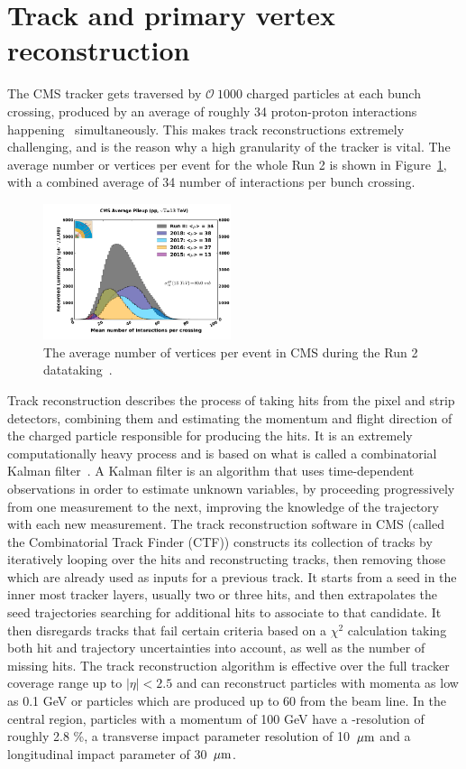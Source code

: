 \section{Track and primary vertex reconstruction}
The CMS tracker gets traversed by $\mathcal{O}~1000$ charged particles at each bunch crossing, produced by an average of roughly 34 proton-proton interactions happening ~simultaneously. This makes track reconstructions extremely challenging, and is the reason why a high granularity of the tracker is vital.
The average number or vertices per event for the whole Run 2 is shown in Figure~\ref{fig:objreco:pu}, with a combined average of 34 number of interactions per bunch crossing.

\begin{figure}[h] 
    \centering
    \includegraphics[width=0.49\textwidth]{figures/event_reconstruction/pu.pdf}
    \caption{The average number of vertices per event in CMS during the Run 2 datataking~\cite{CMSlumi}.}
    \label{fig:objreco:pu}
\end{figure}

Track reconstruction describes the process of taking hits from the pixel and strip detectors, combining them and estimating the momentum and flight direction of the charged particle responsible for producing the hits. It is an extremely computationally heavy process and is based on what is called a combinatorial Kalman filter~\cite{BILLOIR1989390}. A Kalman filter is an algorithm that uses time-dependent observations in order to estimate unknown variables, by proceeding progressively from one measurement to the next, improving the knowledge of the
trajectory with each new measurement. The track reconstruction software in CMS (called the Combinatorial Track Finder (CTF)) constructs its collection of tracks by iteratively looping over the hits and reconstructing tracks, then removing those which are already used as inputs for a previous track. It starts from a seed in the inner most tracker layers, usually two or three hits, and then extrapolates the seed trajectories searching for additional hits to associate to that candidate. It then disregards tracks that fail certain criteria  based on a $\chi^2$ calculation taking both hit and trajectory uncertainties into account, as well as the number of missing hits.
The track reconstruction algorithm is effective over the full tracker coverage range up to $|\eta|<2.5$ and can reconstruct particles with momenta as low as 0.1 GeV or particles which are produced up to 60 \cm from the beam line. In the central region, particles with a momentum of 100 GeV have a \PT-resolution of roughly 2.8 \%, a transverse impact parameter resolution of 10 $\,\mu\text{m}$ and a longitudinal impact parameter of 30 $\,\mu\text{m}$. 


